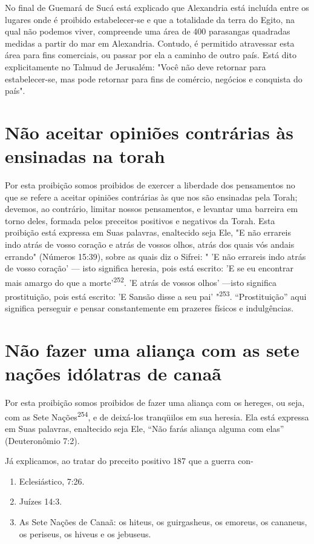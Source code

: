 No final de Guemará de Sucá está explicado que Alexandria está in­cluída
entre os lugares onde é proibido estabelecer-se e que a totalidade da
ter­ra do Egito, na qual não podemos viver, compreende uma área de 400
parasan­gas quadradas medidas a partir do mar em Alexandria. Contudo, é
permitido atravessar esta área para fins comerciais, ou passar por ela a
caminho de outro país. Está dito explicitamente no Talmud de Jerusalém:
"Você não deve retor­nar para estabelecer-se, mas pode retornar para
fins de comércio, negócios e conquista do país".

\section{Não aceitar opiniões contrárias às ensinadas na torah}

Por esta proibição somos proibidos de exercer a liberdade dos
pen­samentos no que se refere a aceitar opiniões contrárias às que nos
são ensina­das pela Torah; devemos, ao contrário, limitar nossos
pensamentos, e levantar uma barreira em torno deles, formada pelos
preceitos positivos e negativos da Torah. Esta proibição está expressa
em Suas palavras, enaltecido seja Ele, "E não errareis indo atrás de
vosso coração e atrás de vossos olhos, atrás dos quais vós andais
errando" (Números 15:39), sobre as quais diz o Sifrei: " 'E não
erra­reis indo atrás de vosso coração' --- isto significa heresia, pois
está escrito: 'E se eu encontrar mais amargo do que a
morte'\textsuperscript{252}. 'E atrás de vossos olhos' ---isto significa
prostituição, pois está escrito: 'E Sansão disse a seu pai'
"\textsuperscript{253}. ``Prostituição'' aqui significa perseguir e pensar
constantemente em prazeres físicos e indulgências.

\section{Não fazer uma aliança com as sete nações idólatras de canaã}

Por esta proibição somos proibidos de fazer uma aliança com os he­reges,
ou seja, com as Sete Nações\textsuperscript{254}, e de deixá-los
tranqüilos em sua here­sia. Ela está expressa em Suas palavras,
enaltecido seja Ele, ``Não farás aliança alguma com elas'' (Deuteronômio
7:2).


Já explicamos, ao tratar do preceito positivo 187 que a guerra con-

\begin{enumerate}
\def\labelenumi{\arabic{enumi}.}
\setcounter{enumi}{251}
\item
 
 Eclesiástico, 7:26.
 
\item
 
 Juízes 14:3.
 
\item
 
 As Sete Nações de Canaã: os hiteus, os guirgasheus, os emoreus, os
 cananeus, os periseus, os hiveus e os jebuseus.
 
\end{enumerate}



